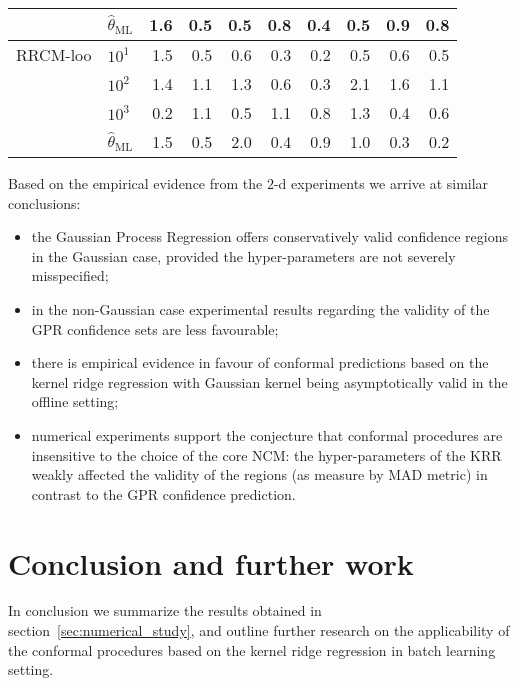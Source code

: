 \documentclass[a4paper,14pt]{extarticle}
\begin{document}
\begin{table}
\begin{tabular}{ll||rrrr|rrrr}
       & $\hat{\theta}_\text{ML}$ &      1.6 &      0.5 &      0.5 &      0.8 &      0.4 &      0.5 &      0.9 &      0.8 \\
  \midrule
  RRCM-loo & $10^1$ &      1.5 &      0.5 &      0.6 &      0.3 &      0.2 &      0.5 &      0.6 &      0.5 \\
       & $10^2$ &      1.4 &      1.1 &      1.3 &      0.6 &      0.3 &      2.1 &      1.6 &      1.1 \\
       & $10^3$ &      0.2 &      1.1 &      0.5 &      1.1 &      0.8 &      1.3 &      0.4 &      0.6 \\
       & $\hat{\theta}_\text{ML}$ &      1.5 &      0.5 &      2.0 &      0.4 &      0.9 &      1.0 &      0.3 &      0.2 \\
  \bottomrule
  \end{tabular}
\end{table}

Based on the empirical evidence from the $2$-d experiments we arrive at similar
conclusions: \begin{itemize}
  \item the Gaussian Process Regression offers conservatively valid confidence regions
  in the Gaussian case, provided the hyper-parameters are not severely misspecified;
  \item in the non-Gaussian case experimental results regarding the validity of the
  GPR confidence sets are less favourable;
  \item there is empirical evidence in favour of conformal predictions based on
  the kernel ridge regression with Gaussian kernel being asymptotically valid in
  the offline setting;
  \item numerical experiments support the  conjecture that conformal procedures
  are insensitive to the choice of the core NCM: the hyper-parameters of the KRR
  weakly affected the validity of the regions (as measure by MAD metric) in contrast
  to the GPR confidence prediction.
\end{itemize}



\section{Conclusion and further work} %
\label{sec:conclusion_and_further_work}

In conclusion we summarize the results obtained in section~\ref{sec:numerical_study},
and outline further research on the applicability of the conformal procedures based
on the kernel ridge regression in batch learning setting.
\end{document}
